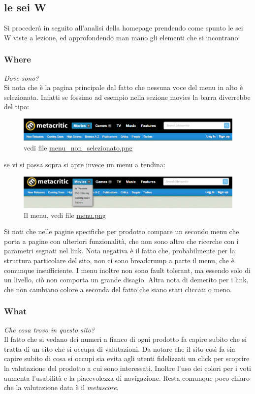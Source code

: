 \documentclass[12pt]{article}
\begin{document}
\subsection{le sei W}
Si procederà in seguito all'analisi della homepage prendendo come spunto le sei W viste a lezione, ed approfondendo man mano gli elementi che si incontrano:

\subsubsection{Where}
\textit{Dove sono?}\\
Si nota che è la pagina principale dal fatto che nessuna voce del menu in alto è selezionata.
Infatti se fossimo ad esempio nella sezione movies la barra diverrebbe del tipo:
\begin{figure}[H]
	\begin{center}
		\includegraphics[width=13.5cm]{menu_non_selezionato.png}
		\caption{vedi file \href{menu_non_selezionato.png}{menu\_non\_selezionato.png}}
	\end{center}
\end{figure}
se vi si passa sopra si apre invece un menu a tendina:
\begin{figure}[H]
	\begin{center}
		\includegraphics[width=13.5cm]{menu.png}
		\caption{Il menu, vedi file \href{menu.png}{menu.png}}
	\end{center}
\end{figure}
Si noti che nelle pagine specifiche per prodotto compare un secondo menu che porta a pagine con ulteriori funzionalità, che non sono altro che ricerche con i parametri segnati nel link.
Nota negativa è il fatto che, probabilmente per la struttura particolare del sito, non ci sono breadcrump a parte il menu, che è comunque insufficiente. I menu inoltre non sono fault tolerant, ma essendo solo di un livello, ciò non comporta un grande disagio.
Altra nota di demerito per i link, che non cambiano colore a seconda del fatto che siano stati cliccati o meno.
\subsubsection{What}
\textit{Che cosa trovo in questo sito?}\\
Il fatto che si vedano dei numeri a fianco di ogni prodotto fa capire subito che si tratta di un sito che si occupa di valutazioni. Da notare che il sito così fa sia capire subito di cosa si occupi sia evita agli utenti fidelizzati un click per scoprire la valutazione del prodotto a cui sono interessati. Inoltre l'uso dei colori per i voti aumenta l'usabilità e la piacevolezza di navigazione. Resta comunque poco chiaro che la valutazione data è il \textit{metascore}.
\end{document}
